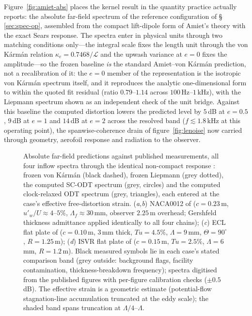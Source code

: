 \documentclass[11pt,a4paper]{article}
\begin{document}
Figure~\ref{fig:amiet-abs} places the kernel result in the quantity
practice actually reports: the absolute far-field spectrum of the
reference configuration of \S\,\ref{sec:spec-op}, assembled from the
compact lift-dipole form of Amiet's theory with the exact Sears
response. The spectra enter in physical units through two matching
conditions only---the integral scale fixes the length unit through the
von K\'arm\'an relation $\kappa_e=0.7468/\mathcal{L}$ and the upwash
variance at $e=0$ fixes the amplitude---so the frozen baseline
\emph{is} the standard Amiet--von K\'arm\'an prediction, not a
recalibration of it: the $e=0$ member of the representation is the
isotropic von K\'arm\'an spectrum itself, and it reproduces the
analytic one-dimensional form to within the quoted fit residual
(ratio $0.79$--$1.14$ across $100$\,Hz--$1$\,kHz), with the Liepmann
spectrum shown as an independent check of the unit bridge. Against
this baseline the computed distortion lowers the predicted level by
$5$\,dB at $e=0.5$, $9$\,dB at $e=1$ and $14$\,dB at $e=2$ across the
resolved band ($f\lesssim1.8$\,kHz at this operating point), the
spanwise-coherence drain of figure~\ref{fig:lenoise} now carried
through geometry, aerofoil response and radiation to the observer.

\begin{figure}
  \centering
  \caption{Absolute far-field predictions against published
  measurements, all four inflow spectra through the identical
  non-compact response \citep{Amiet1975,RogerMoreau2010}: frozen
  von K\'arm\'an (black dashed), frozen Liepmann (grey dotted), the
  computed SC-ODT spectrum (grey, circles) and the computed
  clock-relaxed ODT spectrum (grey, triangles), each entered at the
  case's effective free-distortion strain. (\textit{a,b}) NACA0012 of \citet{PatersonAmiet1976}
  ($c=0.23$\,m, $u'_w/U\approx4$--$5\%$, $\Lambda_f\approx30$\,mm,
  observer $2.25$\,m overhead; Gershfeld thickness admittance applied
  identically to all four chains); (\textit{c}) ECL flat plate of
  \citet{Bampanis2022} ($c=0.10$\,m, $3$\,mm thick, $Tu=4.5\%$,
  $\Lambda=9$\,mm, $\Theta=90^\circ$, $R=1.25$\,m); (\textit{d}) ISVR
  flat plate of \citet{Narayanan2015} ($c=0.15$\,m, $Tu=2.5\%$,
  $\Lambda=6$\,mm, $R=1.2$\,m). Black measured symbols lie in each
  case's stated comparison band (grey outside: background flags,
  facility contamination, thickness-breakdown frequency); spectra
  digitised from the published figures with per-figure calibration
  checks ($\pm0.5$\,dB). The effective strain is a geometric estimate
  (potential-flow stagnation-line accumulation truncated at the eddy
  scale); the shaded band spans truncation at $\Lambda/4$--$\Lambda$.}
  \label{fig:expval}
\end{figure}
\end{document}
